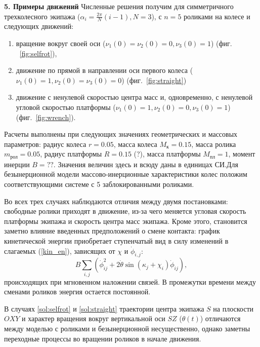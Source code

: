 
{\bf 5. Примеры движений}
Численные решения получим для симметричного трехколесного экипажа ($\alpha_i = \frac{2\pi}{N}(i - 1), N = 3$), с $n = 5$ роликами на колесе и следующих движений:
\begin{enumerate}
  \item \label{sol:selfrot} вращение вокруг своей оси ($\nu_1(0) = \nu_2(0) = 0, \nu_3(0) = 1$) (фиг. ~\ref{fig:selfrot}),
  \item \label{sol:straight} движение по прямой в направлении оси первого колеса ($\nu_1(0) = 1, \nu_2(0) = \nu_3(0) = 0$) (фиг.~\ref{fig:straight})
  \item \label{sol:wrench} движение с ненулевой скоростью центра масс и, одновременно, с ненулевой угловой скоростью платформы ($\nu_1(0) = 1, \nu_2(0) = 0, \nu_3(0) = 1$) (фиг.~\ref{fig:wrench}).
\end{enumerate}


Расчеты выполнены при следующих значениях геометрических и массовых параметров: радиус колеса $r = 0.05$, масса колеса $ M_{\text{к}} = 0.15$, масса ролика $m_{\text{рол}} = 0.05$, радиус платформы $R = 0.15$ (?), масса платформы $M_{\text{пл}} = 1$, момент инерции $B=??$. Значения величин здесь и всюду даны в единицах СИ.Для безынерционной модели массово-инерционные характеристики колес положим соответствующими системе с 5 заблокированными роликами.


Во всех трех случаях наблюдаются отличия между двумя постановками: свободные ролики приходят в движение, из-за чего меняется угловая скорость платформы экипажа и скорость центра масс экипажа. Кроме этого, становится заметно влияние введенных предположений о смене контакта: график кинетической энергии приобретает ступенчатый вид в силу изменений в слагаемых (\ref{kin_en}), зависящих от $\chi$ и $\dot{\phi}_{i,j}$: 
\begin{equation}\label{sines_in_kin_en}
    B\sum_{i,j}(\dot{\phi}_{ij}^2 + 2\dot{\theta}\sin(\kappa_j + \chi_i)\dot{\phi}_{ij}),
\end{equation}
происходящих при мгновенном наложении связей. В промежутки времени между сменами роликов энергия остается постоянной. 

В случаях \ref{sol:selfrot} и \ref{sol:straight} траектории центра экипажа $S$ на плоскости $OXY$ и характер вращения вокруг вертикальной оси $SZ$ ($\theta(t)$) отличаются между моделью с роликами и безынерционной несущественно, однако заметны переходные процессы во вращении роликов в начале движения.

